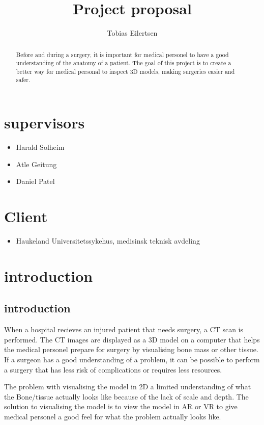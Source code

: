 \documentclass[11pt]{article}
\begin{document}
\title{Project proposal}

\author{Tobias Eilertsen}
\maketitle


\section*{supervisors}
\begin{itemize}
  \item Harald Solheim
  \item Atle Geitung
  \item Daniel Patel
\end{itemize}
\section*{Client}
\begin{itemize}
  \item Haukeland Universitetssykehus, medisinsk teknisk avdeling
\end{itemize}

\begin{abstract}
  Before and during a surgery, it is important for medical personel to have a good understanding of the anatomy of a patient.
  The goal of this project is to create a better way for medical personal to inspect 3D models, making surgeries easier and safer.
\end{abstract}

\newpage
\section{introduction}


\subsection{introduction}

When a hospital recieves an injured patient that needs surgery, a CT scan is performed. The CT images are displayed as a 3D model on a computer that helps the medical personel prepare for surgery by visualising bone mass or other tissue. If a surgeon has a good understanding of a problem, it can be possible to perform a surgery that has less risk of complications or requires less resources.


The problem with visualising the model in 2D a limited understanding of what the Bone/tissue actually looks like because of the lack of scale and depth. The solution to visualising the model is to view the model in AR or VR to give medical personel a good feel for what the problem actually looks like. 
\end{document}
